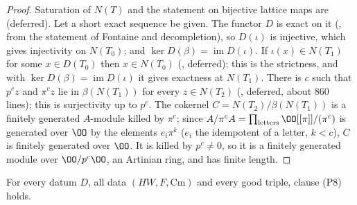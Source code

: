 \begin{proof}
Saturation of $N(T)$ and the statement on bijective lattice maps are  (deferred). Let a short
exact sequence be given. The functor $D$ is exact on it (, from the statement of Fontaine and decompletion), so
$D(\iota)$ is injective, which gives injectivity on $N(T_0)$; and $\ker D(\beta)=\operatorname{im}D(\iota)$. If $\iota(x)\in N(T_1)$ for some $x\in D(T_0)$ then
$x\in N(T_0)$ (, deferred); this is the strictness, and with $\ker D(\beta)=\operatorname{im}D(\iota)$ it gives
exactness at $N(T_1)$. There is $c$ such that $p^cz$ and $\pi^cz$ lie in $\beta(N(T_1))$ for every $z\in N(T_2)$
(, deferred, about $860$ lines); this is surjectivity up to $p^c$. The cokernel $C=N(T_2)/\beta(N(T_1))$ is
a finitely generated $A$-module killed by $\pi^c$; since $A/\pi^cA=\prod_{\text{letters}}\OO[[\pi]]/(\pi^c)$ is generated over $\OO$ by the elements $e_i\pi^k$
($e_i$ the idempotent of a letter, $k<c$), $C$ is finitely generated over $\OO$. It is killed by $p^c\ne0$, so it is a finitely generated module over
$\OO/p^c\OO$, an Artinian ring, and has finite length.
\end{proof}

\begin{proposition}[Clause (P8)]\label{pf:sh-hodge:P8}
For every datum $D$, all data $(HW,F,\mathrm{Cm})$ and every good triple, clause (P8) holds.
\end{proposition}

